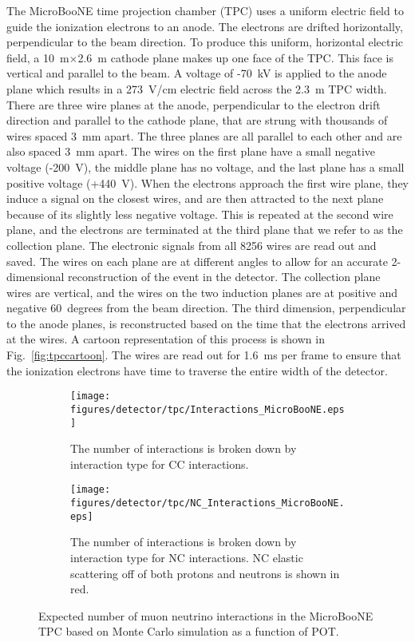   The MicroBooNE time projection chamber (TPC) uses a uniform electric field to
  guide the ionization electrons to an anode. The electrons are drifted
  horizontally, perpendicular to the beam direction. To produce this uniform,
  horizontal electric field, a 10~m$\times$2.6~m cathode plane makes up one
  face of the TPC. This face is vertical and parallel to the beam. A voltage of
  -70~kV is applied to the anode plane which results in a 273~V/cm electric
  field across the 2.3~m TPC width.  There are three wire planes at the anode,
  perpendicular to the electron drift direction and parallel to the cathode
  plane, that are strung with thousands of wires spaced 3~mm apart.  The three
  planes are all parallel to each other and are also spaced 3~mm apart.  The
  wires on the first plane have a small negative voltage (-200~V), the middle
  plane has no voltage, and the last plane has a small positive voltage
  (+440~V). When the electrons approach the first wire plane, they induce a
  signal on the closest wires, and are then attracted to the next plane because
  of its slightly less negative voltage. This is repeated at the second wire
  plane, and the electrons are terminated at the third plane that we refer to
  as the collection plane. The electronic signals from all 8256 wires are read
  out and saved. The wires on each plane are at different angles to allow for
  an accurate 2-dimensional reconstruction of the event in the detector. The
  collection plane wires are vertical, and the wires on the two induction
  planes are at positive and negative 60~degrees from the beam direction. The
  third dimension, perpendicular to the anode planes, is reconstructed based on
  the time that the electrons arrived at the wires. A cartoon representation of
  this process is shown in Fig.~\ref{fig:tpccartoon}. The wires are read out
  for 1.6~ms per frame to ensure that the ionization electrons have time to
  traverse the entire width of the detector.

  \begin{figure}[h]
    \centering
    \begin{subfigure}[t]{2.5in}
      \texttt{[image: figures/detector/tpc/Interactions\_MicroBooNE.eps]}
      \caption{The number of interactions is broken down by interaction type for CC interactions.}
      \label{fig:interactionsal}
    \end{subfigure}
    \hspace{2pt}
    \begin{subfigure}[t]{2.5in}
      \texttt{[image: figures/detector/tpc/NC\_Interactions\_MicroBooNE.eps]}
      \caption{The number of interactions is broken down by interaction type
      for NC interactions. NC elastic scattering off of both protons and
      neutrons is shown in red.}
      \label{fig:interactionsnc}
    \end{subfigure}
    \caption{Expected number of muon neutrino interactions in the
    MicroBooNE TPC based on Monte Carlo simulation as a function of POT.}
    \label{fig:interactions}
  \end{figure}

